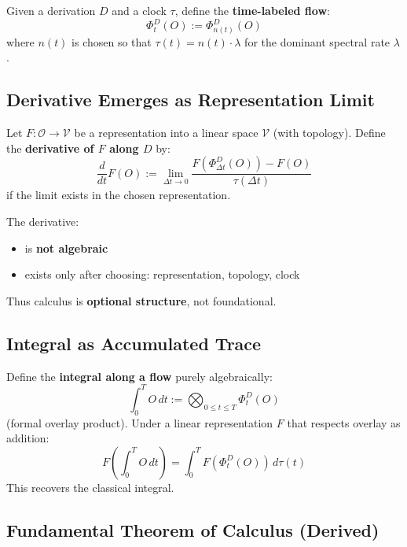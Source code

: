 \documentclass[12pt, oneside]{article}
\newcommand{\Opr}{\mathcal{O}}
\begin{document}
Given a derivation $D$ and a clock $\tau$, define the \textbf{time-labeled flow}:
\begin{equation}
\Phi_t^D(O) := \Phi_{n(t)}^D(O)
\end{equation}
where $n(t)$ is chosen so that $\tau(t) = n(t) \cdot \lambda$ for the dominant spectral rate $\lambda$.

\subsection{Derivative Emerges as Representation Limit}

Let $F: \Opr \rightarrow \mathcal{V}$ be a representation into a linear space $\mathcal{V}$ (with topology). Define the \textbf{derivative of $F$ along $D$} by:
\begin{equation}
\frac{d}{dt} F(O) := \lim_{\Delta t \to 0} \frac{F(\Phi_{\Delta t}^D(O)) - F(O)}{\tau(\Delta t)}
\end{equation}
if the limit exists in the chosen representation.

The derivative:
\begin{itemize}
    \item is \textbf{not algebraic}
    \item exists only after choosing: representation, topology, clock
\end{itemize}
Thus calculus is \textbf{optional structure}, not foundational.

\subsection{Integral as Accumulated Trace}

Define the \textbf{integral along a flow} purely algebraically:
\begin{equation}
\int_0^T O \, dt := \bigotimes_{0 \leq t \leq T} \Phi_t^D(O)
\end{equation}
(formal overlay product). Under a linear representation $F$ that respects overlay as addition:
\begin{equation}
F\left( \int_0^T O \, dt \right) = \int_0^T F(\Phi_t^D(O)) \, d\tau(t)
\end{equation}
This recovers the classical integral.

\subsection{Fundamental Theorem of Calculus (Derived)}
\end{document}
